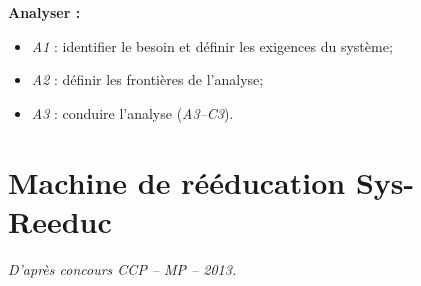 \documentclass[10pt]{article}
\begin{document}



 \renewcommand{\baselinestretch}{1.2}
\setlength{\parskip}{2ex plus 0.5ex minus 0.2ex}


\begin{comp}
\noindent \textbf{Analyser :} 
\begin{itemize}
\item \textit{A1} : identifier le besoin et définir les exigences du système;
\item \textit{A2} : définir les frontières de l'analyse;
\item \textit{A3} : conduire l'analyse (\textit{A3--C3}).
\end{itemize}

\end{comp}

\section*{Machine de rééducation Sys-Reeduc}

\begin{flushright}
\textit{D'après concours CCP -- MP -- 2013.}
\end{flushright}

\end{document}
